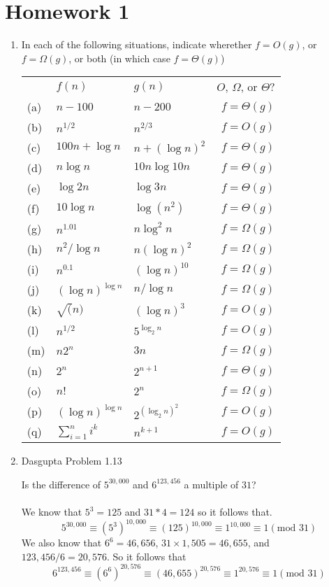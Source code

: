 \documentclass[a4paper,12pt]{article}
\begin{document}
\section*{Homework 1}

\begin{enumerate}
    \item In each of the following situations, indicate wherether $f = O(g)$, or $f = \Omega(g)$, or both (in which case $f = \Theta(g)$)

    \begin{tabular}{lll|r}
      ~ & $f(n)$ & $g(n)$ & $O$, $\Omega$, or $\Theta$?\\
      (a) & $n - 100$ & $n - 200$ & $f = \Theta(g)$ \\
      (b) & $n^{1/2}$ & $n^{2/3}$ & $f = O(g)$\\
      (c) & $100n + \log n$ & $n + (\log n)^2$& $f = \Theta(g)$ \\
      (d) & $n \log n $ & $10n \log 10n$ & $f = \Theta(g)$\\
      (e) & $\log 2n$ & $\log 3n$ & $f = \Theta(g)$ \\
      (f) & $10 \log n$ & $\log(n^2)$ & $f = \Theta(g)$ \\
      (g) & $n^{1.01}$ & $n \log^2 n$ & $f = \Omega(g)$\\
      (h) & $n^2 / \log n$ & $n(\log n)^2$ & $f = \Omega(g)$\\
      (i) & $n^{0.1}$ & $(\log n)^{10}$ & $f = \Omega(g)$\\
      (j) & $(\log n)^{\log n}$ & $n / \log n$ & $f = \Omega(g)$\\
      (k) & $\sqrt(n)$ & $(\log n)^3$ & $f = O(g)$\\
      (l) & $n^{1/2}$ & $5^{\log_2 n}$ & $f = O(g)$\\
      (m) & $n2^n$ & $3n$ & $f = \Omega(g)$\\
      (n) & $2^n$ & $2^{n+1}$ & $f = \Theta(g)$ \\
      (o) & $n!$ & $2^n$ & $f = \Omega(g)$ \\
      (p) & $(\log n)^{\log n}$ & $2^{(\log_2 n)^2}$ & $f = O(g)$ \\
      (q) & $\sum_{i = 1}^n i^k$ & $n^{k+1}$ & $f = O(g)$\\
    \end{tabular}
    \item Dasgupta Problem 1.13

    Is the difference of $5^{30,000}$ and $6^{123,456}$ a multiple of $31$?
    \\\\
    We know that $5^3 = 125$ and $31*4 = 124$ so it follows that.
    $$5^{30,000} \equiv (5^3)^{10,000} \equiv (125)^{10,000} \equiv 1^{10,000} \equiv 1 (\text{mod } 31)$$
    We also know that $6^6 = 46,656$, $31\times 1,505 = 46,655$, and $123,456/6=20,576$. So it follows that
    $$6^{123,456} \equiv (6^6)^{20,576} \equiv (46,655)^{20,576} \equiv 1^{20,576} \equiv 1 (\text{mod } 31)$$


\end{enumerate}
\end{document}

